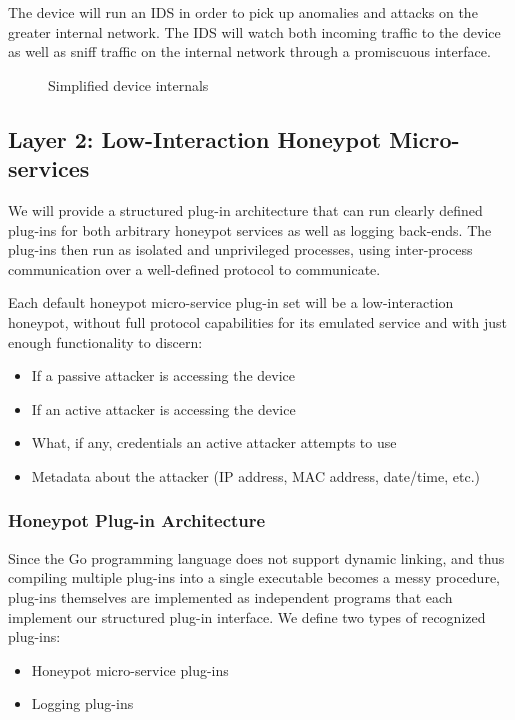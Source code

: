 The device will run an IDS in order to pick up anomalies and attacks on
the greater internal network. The IDS will watch both incoming traffic to
the device as well as sniff traffic on the internal network through a
promiscuous interface.

\begin{figure}
\centering
{

}
\caption{Simplified device internals}
\label{figure:device}
\end{figure}
 

\subsection{Layer 2: Low-Interaction Honeypot Micro-services}

We will provide a structured plug-in architecture that can run clearly defined
plug-ins for both arbitrary honeypot services as well as logging back-ends.
The plug-ins then run as isolated and unprivileged processes, using inter-process
communication over a well-defined protocol to communicate.

Each default honeypot micro-service plug-in set will be a low-interaction
honeypot, without full protocol capabilities for its emulated service and
with just enough functionality to discern:

\begin{itemize}
    \item If a passive attacker is accessing the device
    \item If an active attacker is accessing the device
    \item What, if any, credentials an active attacker attempts to use
    \item Metadata about the attacker (IP address, MAC address, date/time, etc.)
\end{itemize}

\subsubsection{Honeypot Plug-in Architecture}

Since the Go programming language does not support dynamic linking,
and thus compiling multiple plug-ins into a single executable becomes a messy
procedure, plug-ins themselves are implemented as independent programs
that each implement our structured plug-in interface. We define two types of
recognized plug-ins:
\begin{itemize}
    \item Honeypot micro-service plug-ins
    \item Logging plug-ins
\end{itemize}

